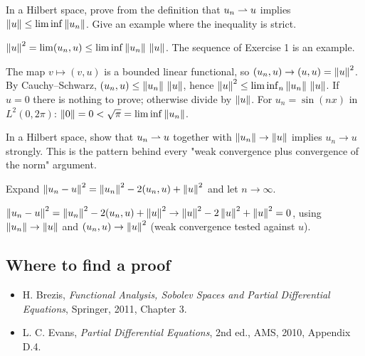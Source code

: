 \begin{exercise}
  In a Hilbert space, prove from the definition that $u_n \rightharpoonup u$ implies $\left\lVert u\right\rVert \le \liminf\left\lVert u_n\right\rVert$. Give an example where the inequality is strict.
  \begin{hint}
    $\left\lVert u\right\rVert^2 = \lim (u_n, u) \le \liminf \left\lVert u_n\right\rVert\,\left\lVert u\right\rVert$. The sequence of Exercise 1 is an example.
  \end{hint}
  \begin{solution}
    The map $v \mapsto (v, u)$ is a bounded linear functional, so $(u_n, u) \to (u, u) = \left\lVert u\right\rVert^2$. By Cauchy--Schwarz, $(u_n, u) \le \left\lVert u_n\right\rVert\,\left\lVert u\right\rVert$, hence $\left\lVert u\right\rVert^2 \le \liminf_n\left\lVert u_n\right\rVert\,\left\lVert u\right\rVert$. If $u = 0$ there is nothing to prove; otherwise divide by $\left\lVert u\right\rVert$. For $u_n = \sin(nx)$ in $L^2(0,2\pi)$: $\left\lVert 0\right\rVert = 0 < \sqrt\pi = \liminf\left\lVert u_n\right\rVert$.
  \end{solution}
\end{exercise}

\begin{exercise}
  In a Hilbert space, show that $u_n \rightharpoonup u$ together with $\left\lVert u_n\right\rVert \to \left\lVert u\right\rVert$ implies $u_n \to u$ strongly. This is the pattern behind every "weak convergence plus convergence of the norm" argument.
  \begin{hint}
    Expand $\left\lVert u_n - u\right\rVert^2 = \left\lVert u_n\right\rVert^2 - 2(u_n, u) + \left\lVert u\right\rVert^2$ and let $n \to \infty$.
  \end{hint}
  \begin{solution}
    $\left\lVert u_n - u\right\rVert^2 = \left\lVert u_n\right\rVert^2 - 2(u_n, u) + \left\lVert u\right\rVert^2 \to \left\lVert u\right\rVert^2 - 2\left\lVert u\right\rVert^2 + \left\lVert u\right\rVert^2 = 0$, using $\left\lVert u_n\right\rVert \to \left\lVert u\right\rVert$ and $(u_n, u) \to \left\lVert u\right\rVert^2$ (weak convergence tested against $u$).
  \end{solution}
\end{exercise}

\subsection*{Where to find a proof}

\begin{itemize}
\item H. Brezis, \emph{Functional Analysis, Sobolev Spaces and Partial Differential Equations}, Springer, 2011, Chapter 3.
\item L. C. Evans, \emph{Partial Differential Equations}, 2nd ed., AMS, 2010, Appendix D.4.
\end{itemize}

\neededfor
